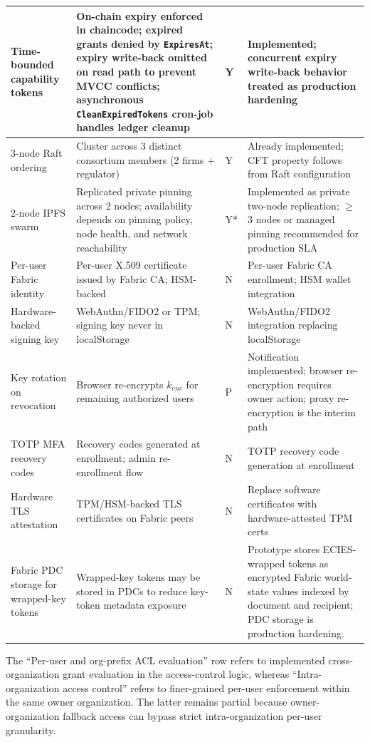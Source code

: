 \documentclass{ieeeaccess}
\begin{document}
\begin{table}[!t]
\begin{tabularx}{\textwidth}{|p{3cm}|X|p{1.4cm}|X|}
\hline
Time-bounded capability tokens &
On-chain expiry enforced in chaincode; expired grants denied by
\texttt{ExpiresAt}; expiry write-back omitted on read path to prevent MVCC conflicts;
asynchronous \texttt{CleanExpiredTokens} cron-job handles ledger cleanup &
Y &
Implemented; concurrent expiry write-back behavior treated as
production hardening \\
\hline
3-node Raft ordering &
Cluster across 3 distinct consortium members (2 firms + regulator) &
Y &
Already implemented; CFT property follows from Raft configuration \\
\hline
2-node IPFS swarm &
Replicated private pinning across 2 nodes; availability depends on
pinning policy, node health, and network reachability &
Y* &
Implemented as private two-node replication; $\geq$3 nodes or managed
pinning recommended for production SLA \\
\hline
Per-user Fabric identity &
Per-user X.509 certificate issued by Fabric CA; HSM-backed &
N &
Per-user Fabric CA enrollment; HSM wallet integration \\
\hline
Hardware-backed signing key &
WebAuthn/FIDO2 or TPM; signing key never in localStorage &
N &
WebAuthn/FIDO2 integration replacing localStorage \\
\hline
Key rotation on revocation &
Browser re-encrypts $k_{enc}$ for remaining authorized users &
P &
Notification implemented; browser re-encryption requires owner
action; proxy re-encryption is the interim path \\
\hline
TOTP MFA recovery codes &
Recovery codes generated at enrollment; admin re-enrollment flow &
N &
TOTP recovery code generation at enrollment \\
\hline
Hardware TLS attestation &
TPM/HSM-backed TLS certificates on Fabric peers &
N &
Replace software certificates with hardware-attested TPM certs \\
\hline
Fabric PDC storage for wrapped-key tokens &
Wrapped-key tokens may be stored in PDCs to reduce key-token metadata exposure &
N &
Prototype stores ECIES-wrapped tokens as encrypted Fabric world-state values indexed by document and recipient; PDC storage is production hardening.
\\
\hline
\end{tabularx}
\par\vspace{3pt}
\begin{minipage}{\textwidth}
\raggedright\scriptsize
\smallskip
The ``Per-user and org-prefix ACL evaluation'' row refers to implemented
cross-organization grant evaluation in the access-control logic, whereas
``Intra-organization access control'' refers to finer-grained per-user
enforcement within the same owner organization. The latter remains partial
because owner-organization fallback access can bypass strict
intra-organization per-user granularity.
\end{minipage}
\end{table}
\end{document}
